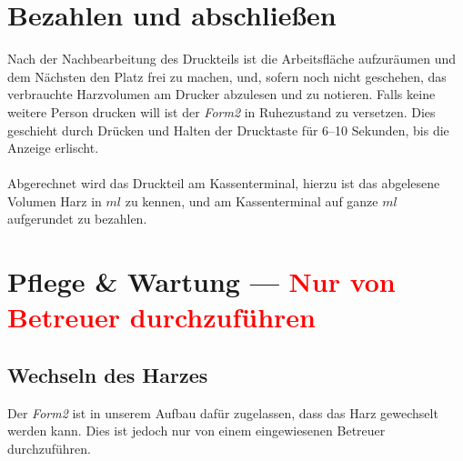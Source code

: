 \documentclass{\basedir/fablab-document}
\begin{document}
\begin{enumerate}
\end{enumerate}


\section{Bezahlen und abschließen}

Nach der Nachbearbeitung des Druckteils ist die Arbeitsfläche aufzuräumen und dem Nächsten den Platz frei zu machen, und, sofern noch nicht geschehen, das verbrauchte Harzvolumen am Drucker abzulesen und zu notieren. Falls keine weitere Person drucken will ist der \textit{Form2} in Ruhezustand zu versetzen. Dies geschieht durch Drücken und Halten der Drucktaste für 6--10 Sekunden, bis die Anzeige erlischt. \\
\\
Abgerechnet wird das Druckteil am Kassenterminal, hierzu ist das abgelesene Volumen Harz in $ml$ zu kennen, und am Kassenterminal auf ganze $ml$ aufgerundet zu bezahlen.
\pagebreak


\section{Pflege \& Wartung --- \textcolor{red}{Nur von Betreuer durchzuführen}}

\subsection{Wechseln des Harzes}
Der \textit{Form2} ist in unserem Aufbau dafür zugelassen, dass das Harz gewechselt werden kann. Dies ist jedoch nur von einem eingewiesenen Betreuer durchzuführen. 
\end{document}
